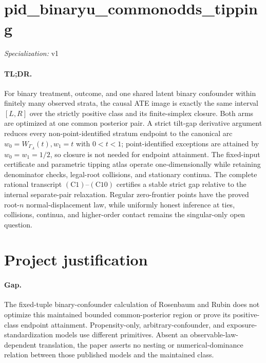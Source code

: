 \documentclass{article}
\begin{document}
\sloppy

\section*{pid\_\allowbreak{}binaryu\_\allowbreak{}commonodds\_\allowbreak{}tipping}

\noindent\textit{Specialization:} v1\par

\paragraph{TL;DR.} For binary treatment, outcome, and one shared latent binary confounder within finitely many observed strata, the causal ATE image is exactly the same interval \([L,R]\) over the strictly positive class and its finite-simplex closure.  Both arms are optimized at one common posterior pair.  A strict tilt-gap derivative argument reduces every non-point-identified stratum endpoint to the canonical arc \(w_0=W_{\Gamma_A}(t),w_1=t\) with \(0<t<1\); point-identified exceptions are attained by \(w_0=w_1=1/2\), so closure is not needed for endpoint attainment.  The fixed-input certificate and parametric tipping atlas operate one-dimensionally while retaining denominator checks, legal-root collisions, and stationary continua.  The complete rational transcript \((\mathrm{C1})\)--\((\mathrm{C10})\) certifies a stable strict gap relative to the internal separate-pair relaxation.  Regular zero-frontier points have the proved root-\(n\) normal-displacement law, while uniformly honest inference at ties, collisions, continua, and higher-order contact remains the singular-only open question.

\section{Project justification}

\paragraph{Gap.} The fixed-tuple binary-confounder calculation of Rosenbaum and Rubin does not optimize this maintained bounded common-posterior region or prove its positive-class endpoint attainment.  Propensity-only, arbitrary-confounder, and exposure-standardization models use different primitives.  Absent an observable-law-dependent translation, the paper asserts no nesting or numerical-dominance relation between those published models and the maintained class.
\end{document}
